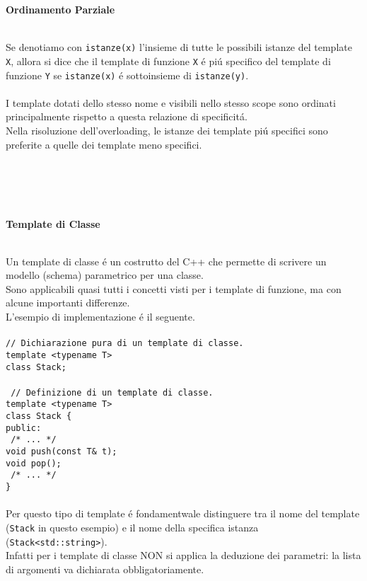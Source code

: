 \documentclass{article}
\newcommand\tab[1][1cm]{\hspace*{#1}}
\begin{document}
\begin{large}\textbf{\textcolor{blu}{Ordinamento Parziale}} \\ \\\end{large}
Se denotiamo con \texttt{istanze(x)} l'insieme di tutte le possibili istanze del template \texttt{X}, allora si dice che il template di funzione \texttt{X} \'e pi\'u specifico del template di funzione \texttt{Y} se \texttt{istanze(x)} \'e sottoinsieme di \texttt{istanze(y)}.\\ \\
I template dotati dello stesso nome e visibili nello stesso scope sono ordinati principalmente rispetto a questa relazione di specificit\'a.\\Nella risoluzione dell'overloading, le istanze dei template pi\'u specifici sono preferite a quelle dei template meno specifici.
\\ \\ \\ \\ \\
\begin{large}\textbf{\textcolor{blu}{Template di Classe}} \\ \\ \end{large}
Un template di classe \'e un costrutto del C++ che permette di scrivere un modello (schema) parametrico per una classe.\\Sono applicabili quasi tutti i concetti visti per i template di funzione, ma con alcune importanti differenze.\\L'esempio di implementazione \'e il seguente.\\ \\ 
\texttt{\textcolor{grigio}{// Dichiarazione pura di un template di classe. }\\ template <typename T> \\ class Stack; \\ \\\textcolor{grigio}{ // Definizione di un template di classe. } \\ template <typename T> \\ class Stack \{ \\ \tab public: \\ \tab \tab \textcolor{grigio}{ /* ... */ } \\ \tab \tab void push(const T\& t); \\ \tab \tab void pop(); \\ \tab \tab \textcolor{grigio}{ /* ... */  }\\ \} } \\ \\Per questo tipo di template \'e fondamentwale distinguere tra il nome del template (\texttt{Stack} in questo esempio) e il nome della specifica istanza (\texttt{Stack<std::string>}).\\Infatti per i template di classe NON si applica la deduzione dei parametri: la lista di argomenti va dichiarata obbligatoriamente. \\ \\
\end{document}
